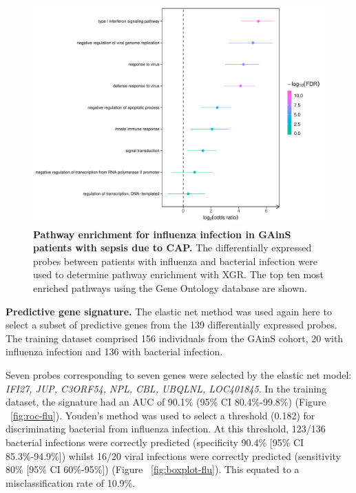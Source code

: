 \FloatBarrier
\begin{figure}[htbp]
\centering
\includegraphics[width=\textwidth]{./Results3/Images/xgr-flu.pdf}
\caption[Pathway analysis for influenza infection]{\textbf{Pathway enrichment for influenza infection in GAinS patients with sepsis due to CAP.} The differentially expressed probes between patients with influenza and bacterial infection were used to determine pathway enrichment with XGR. The top ten most enriched pathways using the Gene Ontology database are shown.}
\label{fig:xgr-flu}
\end{figure}
\FloatBarrier


\textbf{Predictive gene signature.}
The elastic net method was used again here to select a subset of predictive genes from the 139 differentially expressed probes. The training dataset comprised 156 individuals from the GAinS cohort, 20 with influenza infection and 136 with bacterial infection. 

Seven probes corresponding to seven genes were selected by the elastic net model: \textit{IFI27, JUP, C3ORF54, NPL, CBL, UBQLNL, LOC401845}. In the training dataset, the signature had an AUC of 90.1\% (95\% CI 80.4\%-99.8\%) (Figure ~\ref{fig:roc-flu}). Youden's method was used to select a threshold (0.182) for discriminating bacterial from influenza infection. At this threshold, 123/136 bacterial infections were correctly predicted (specificity 90.4\% [95\% CI 85.3\%-94.9\%]) whilst 16/20 viral infections were correctly predicted (sensitivity 80\% [95\% CI 60\%-95\%]) (Figure ~\ref{fig:boxplot-flu}). This equated to a misclassification rate of 10.9\%.

